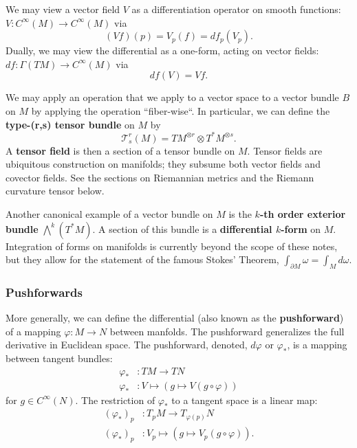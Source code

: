 \documentclass[reqno]{amsart}
\numberwithin{equation}{section}
\begin{document}
We may view a vector field $V$ as a differentiation operator on smooth functions: $V : C^{\infty}(M) \to C^{\infty}(M)$
via
$$
    (Vf)(p) = V_p(f) = df_p(V_p).
$$
Dually, we may view the differential as a one-form, acting on vector fields: $df : \Gamma(TM) \to C^{\infty}(M)$ via
$$
    df(V) = Vf.
$$

We may apply an operation that we apply to a vector space to a vector bundle $B$ on $M$ by
applying the operation ``fiber-wise``. In particular, we can define the \textbf{type-(r,s) tensor bundle} on $M$ by
$$
    \mathcal T^r_s(M) = TM^{\otimes r} \otimes T^*M^{\otimes s}.
$$
A \textbf{tensor field} is then a section of a tensor bundle on $M$. Tensor fields are ubiquitous construction on
manifolds; they subsume both vector fields and covector fields. See the sections on Riemannian metrics and
the Riemann curvature tensor below.

Another canonical example of a vector bundle on $M$ is the \textbf{$k$-th order exterior bundle}
$\bigwedge^k(T^*M)$. A section of this bundle is a \textbf{differential $k$-form} on $M$. Integration of forms on
manifolds is currently beyond the scope of these notes, but they allow for the statement of the famous
Stokes' Theorem, $\int_{\partial M} \omega = \int_M d\omega$.

\subsubsection{Pushforwards}

More generally, we can define the differential (also known as the \textbf{pushforward}) of a mapping
$\varphi : M \to N$ between manfolds. The pushforward generalizes the full derivative in Euclidean space.
The pushforward, denoted, $d\varphi$ or $\varphi_*$, is a mapping between
tangent bundles:
\begin{align*}
    \varphi_* &: TM \to TN \\
    \varphi_* &: V \mapsto (g \mapsto V(g \circ \varphi))
\end{align*}
for $g \in C^{\infty}(N)$. The restriction of $\varphi_*$ to a tangent space is a linear map:
\begin{align*}
    (\varphi_*)_p &: T_pM \to T_{\varphi(p)}N \\
    (\varphi_*)_p &: V_p \mapsto (g \mapsto V_p (g \circ \varphi)).
\end{align*}
\end{document}

